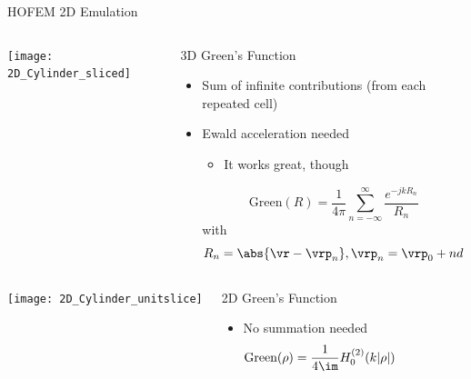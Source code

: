 %
%

\begin{frame}[allowframebreaks]{HOFEM 2D Emulation}

  \begin{columns}
     \centering
    {\texttt{[image: 2D\_Cylinder\_sliced]}}

     \centering
    \begin{block}{3D Green's Function}
      \begin{itemize}
      \item Sum of infinite contributions (from each repeated cell)
      \item Ewald acceleration needed
        \begin{itemize}
        \item It works great, though
        \end{itemize}
        \begin{equation*}
          \text{Green}(R) = \dfrac{1}{4\pi}
          \sum_{n=-\infty}^\infty \dfrac{e^{-j k R_n}}{R_n}
        \end{equation*}
        with
        \begin{equation*}
          R_n=\abs{\vr-\vrp_n}, \vrp_n=\vrp_0 + n d
        \end{equation*}
      \end{itemize}
    \end{block}
  \end{columns}

  \framebreak %

  \begin{columns}
     \centering
    {\texttt{[image: 2D\_Cylinder\_unitslice]}}
    
     \centering
    \begin{block}{2D Green's Function}
      \begin{itemize}
      \item No summation needed
        \begin{equation*}
          \text{Green}(\rho) = \dfrac{1}{4\im}  H_0^{(2)}(k|\rho|)
        \end{equation*}
      \end{itemize}
    \end{block}
  \end{columns}

  
 \end{frame}
  
